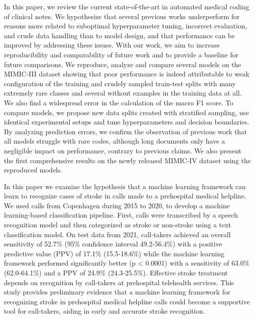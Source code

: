 In this paper, we review the current state-of-the-art in automated medical coding of clinical notes. 
We hypothesize that several previous works underperform for reasons more related to suboptimal hyperparameter tuning, incorrect evaluation, and crude data handling than to model design, and that performance can be improved by addressing these issues. 
With our work, we aim to increase reproducibility and comparability of future work and to provide a baseline for future comparisons. 
We reproduce, analyze and compare several models on the MIMIC-III dataset showing that poor performance is indeed attributable to weak configuration of the training and crudely sampled train-test splits with many extremely rare classes and several without examples in the training data at all. 
We also find a widespread error in the calculation of the macro F1 score. 
To compare models, we propose new data splits created with stratified sampling, use identical experimental setups and tune hyperparameters and decision boundaries. 
By analyzing prediction errors, we confirm the observation of previous work that all models struggle with rare codes, although long documents only have a negligible impact on performance, contrary to previous claims. 
We also present the first comprehensive results on the newly released MIMIC-IV dataset using the reproduced models. 

In this paper we examine the hypothesis that a machine learning framework can learn to recognize cases of stroke in calls made to a prehospital medical helpline. 
We used calls from Copenhagen during 2015 to 2020, to develop a machine learning-based classification pipeline. First, calls were transcribed by a speech recognition model and then categorized as stroke or non-stroke using a text classification model.
On test data from 2021, call-takers achieved an overall sensitivity of 52.7\% (95\% confidence interval 49.2-56.4\%) with a positive predictive value (PPV) of 17.1\% (15.5-18.6\%) while the machine learning framework performed significantly better (p < 0.0001) with a sensitivity of 63.0\% (62.0-64.1\%) and a PPV of 24.9\% (24.3-25.5\%).
Effective stroke treatment depends on recognition by call-takers at prehospital telehealth services. 
This study provides preliminary evidence that a machine learning framework for recognizing stroke in prehospital medical helpline calls could become a supportive tool for call-takers, aiding in early and accurate stroke recognition.

